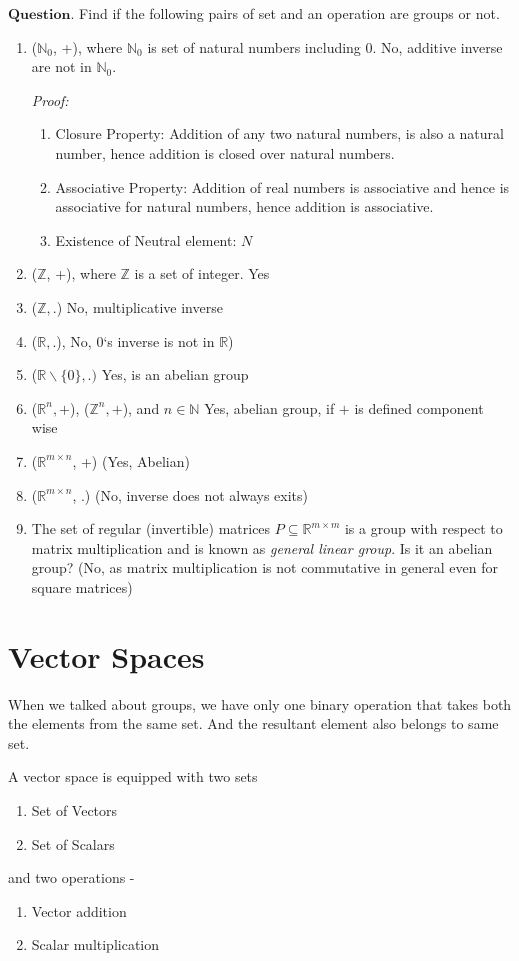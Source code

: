 \documentclass{article}
\begin{document}
$\boldsymbol{Question}$. Find if the following pairs of set and an operation are groups or not.
\begin{enumerate}
    \item ($\mathbb{N}_0$, +), where $\mathbb{N}_0$ is set of natural numbers including 0. No, additive inverse are not in $\mathbb{N}_0$.\par
    \textit{Proof: } 
        \begin{enumerate}
            \item Closure Property: Addition of any two natural numbers, is also a natural number, hence addition is closed over natural numbers.
            \item Associative Property: Addition of real numbers is associative and hence is associative for natural numbers, hence addition is associative.
            \item Existence of Neutral element: $N$
        \end{enumerate}
    \item ($\mathbb{Z}$, +), where $\mathbb{Z}$ is a set of integer. Yes
    
    \item ($\mathbb{Z}, .$) No, multiplicative inverse
    \item ($\mathbb{R}, .$), No, 0`s inverse is not in $\mathbb{R}$)
    \item ($\mathbb{R} \backslash \{0\}, .)$ Yes, is an abelian group
    \item ($\mathbb{R}^n, +$), ($\mathbb{Z}^n, +$), and $n \in \mathbb{N}$ Yes, abelian group, if $+$ is defined component wise
    \item ($\mathbb{R}^{m\times n}$, +) (Yes, Abelian)
    \item ($\mathbb{R}^{m\times n}$, .) (No, inverse does not always exits)
    \item The set of regular (invertible) matrices  $P\subseteq \mathbb{R}^{m\times m}$ is a group with respect to matrix multiplication and is known as \textit{general linear group}. Is it an abelian group? (No, as matrix multiplication is not commutative in general even for square matrices)
\end{enumerate}


\section{Vector Spaces}

When we talked about groups, we have only one binary operation that takes both the elements from the same set. And the resultant element also belongs to same set.\par
A vector space is equipped with two sets 
\begin{enumerate}
    \item Set of Vectors
    \item Set of Scalars
\end{enumerate}
and two operations -
\begin{enumerate}
    \item Vector addition 
    \item Scalar multiplication 
\end{enumerate}
\end{document}
